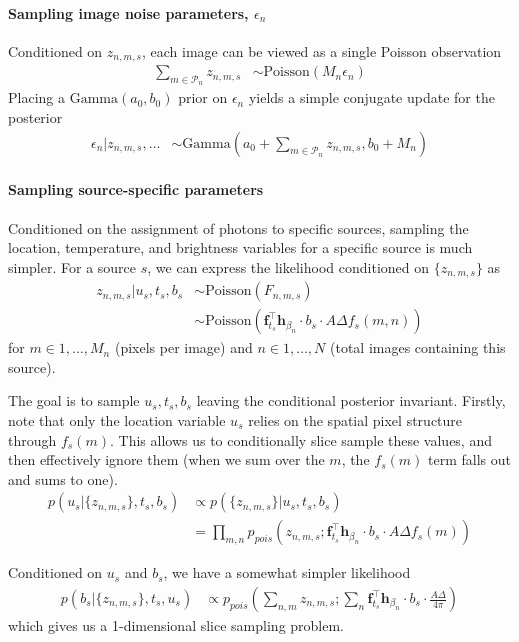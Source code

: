 \documentclass[11pt]{article}
\newcommand{\trans}{\intercal}
\begin{document}
\paragraph{Sampling image noise parameters, $\epsilon_n$}
Conditioned on $z_{n,m,s}$, each image can be viewed as a single Poisson observation
\begin{align}
  \sum_{m \in \mathcal{P}_n} z_{n,m,s} &\sim \textrm{Poisson}(M_n \epsilon_n)
\end{align}
Placing a $\textrm{Gamma}(a_0, b_0)$ prior on $\epsilon_n$ yields a simple conjugate update for the posterior 
\begin{align}
  \epsilon_n | z_{n,m,s}, \dots &\sim \textrm{Gamma}\left(a_0 + \sum_{m\in \mathcal{P}_n} z_{n,m,s}, b_0 + M_n \right)
\end{align}
 
\paragraph{Sampling source-specific parameters}
Conditioned on the assignment of photons to specific sources, sampling the location, temperature, and brightness variables for a specific source is much simpler.  For a source $s$, we can express the likelihood conditioned on $\{z_{n,m,s}\}$ as 
\begin{align}
  z_{n,m,s} | u_s, t_s, b_s 
    &\sim \textrm{Poisson}(F_{n,m,s}) \\
    &\sim \textrm{Poisson}\left(\mathbf{f}_{t_s}^\trans \mathbf{h}_{\beta_n} \cdot b_s \cdot A \Delta f_s(m,n) \right)
\end{align}
for $m \in 1, \dots, M_n$ (pixels per image) and $n \in 1, \dots, N$ (total images containing this source).  

The goal is to sample $u_s, t_s, b_s$ leaving the conditional posterior invariant.  Firstly, note that only the location variable $u_s$ relies on the spatial pixel structure through $f_s(m)$.  This allows us to conditionally slice sample these values, and then effectively ignore them (when we sum over the $m$, the $f_s(m)$ term falls out and sums to one).  
\begin{align}
  p(u_s | \{ z_{n,m,s} \}, t_s, b_s) &\propto p( \{ z_{n,m,s} \} | u_s, t_s, b_s) \\
  &= \prod_{m,n} p_{pois}\left(z_{n,m,s}; \mathbf{f}_{t_s}^\trans \mathbf{h}_{\beta_n} \cdot b_s \cdot A \Delta f_s(m) \right)
\end{align}

Conditioned on $u_s$ and $b_s$, we have a somewhat simpler likelihood 
\begin{align}
  p(b_s | \{z_{n,m,s}\}, t_s, u_s) 
    &\propto p_{pois}\left( \sum_{n,m} z_{n,m,s};  \sum_{n} \mathbf{f}_{t_s}^\trans \mathbf{h}_{\beta_n} \cdot b_s \cdot \frac{A \Delta}{4 \pi} \right) 
\end{align}
which gives us a 1-dimensional slice sampling problem.  
\end{document}
